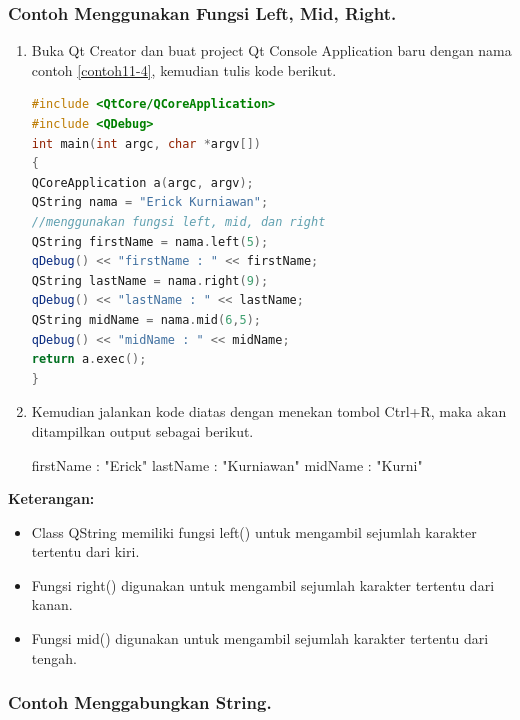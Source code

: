 \subsubsection*{Contoh  Menggunakan Fungsi Left, Mid, Right.}

\begin{enumerate}

\item
  Buka Qt Creator dan buat project Qt Console Application baru dengan
  nama contoh \ref{contoh11-4}, kemudian tulis kode berikut.

\begin{lstlisting}[language=c++,caption= Menggunakan Fungsi Left Mid Right, label=contoh11-4]
#include <QtCore/QCoreApplication>
#include <QDebug>
int main(int argc, char *argv[])
{
QCoreApplication a(argc, argv);
QString nama = "Erick Kurniawan";
//menggunakan fungsi left, mid, dan right
QString firstName = nama.left(5);
qDebug() << "firstName : " << firstName;
QString lastName = nama.right(9);
qDebug() << "lastName : " << lastName;
QString midName = nama.mid(6,5);
qDebug() << "midName : " << midName;
return a.exec();
}
\end{lstlisting}
\item
  Kemudian jalankan kode diatas dengan menekan tombol Ctrl+R, maka akan
  ditampilkan output sebagai berikut.

  \begin{lcverbatim}
  firstName :  "Erick"
lastName :  "Kurniawan"
midName :  "Kurni"
\end{lcverbatim}
\end{enumerate}

\textbf{Keterangan:}

\begin{itemize}

\item
  Class QString memiliki fungsi left() untuk mengambil sejumlah karakter
  tertentu dari kiri.
\item
  Fungsi right() digunakan untuk mengambil sejumlah karakter tertentu
  dari kanan.
\item
  Fungsi mid() digunakan untuk mengambil sejumlah karakter tertentu dari
  tengah.
\end{itemize}

\subsubsection*{Contoh Menggabungkan String.}

